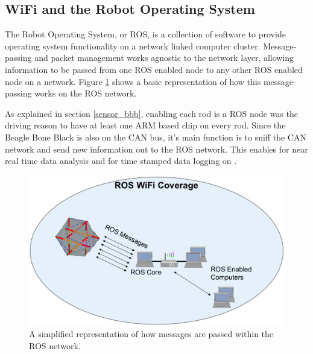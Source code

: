 \subsection{WiFi and the Robot Operating System}
The Robot Operating System, or ROS, is a collection of software to provide operating system functionality on a network linked computer cluster. 
Message-passing and packet management works agnostic to the network layer, allowing information to be passed from one ROS enabled node to any other ROS enabled node on a network.
Figure \ref{fig:ros_diagram} shows a basic representation of how this message-passing works on the \SB{} ROS network.

As explained in section \ref{sensor_bbb}, enabling each rod is a ROS node was the driving reason to have at least one ARM based chip on every rod.
Since the Beagle Bone Black is also on the CAN bus, it's main function is to sniff the CAN network and send new information out to the ROS network.
This enables for near real time data analysis and for time stamped data logging on \SB{}.

\begin{figure}[thpb]%
      \centering
      \includegraphics[width=0.8\columnwidth]{tex/img/ROS_Wireless}
      \caption{A simplified representation of how messages are passed within the \SB{} ROS network.}
      \label{fig:ros_diagram}
\end{figure}
